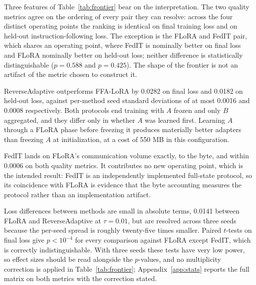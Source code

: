 Three features of Table~\ref{tab:frontier} bear on the interpretation. The two quality metrics agree on the ordering of every pair they can resolve: across the four distinct operating points the ranking is identical on final training loss and on held-out instruction-following loss. The exception is the FLoRA and FedIT pair, which shares an operating point, where FedIT is nominally better on final loss and FLoRA nominally better on held-out loss; neither difference is statistically distinguishable ($p{=}0.588$ and $p{=}0.425$). The shape of the frontier is not an artifact of the metric chosen to construct it.

ReverseAdaptive outperforms FFA-LoRA by 0.0282 on final loss and 0.0182 on held-out loss, against per-method seed standard deviations of at most 0.0016 and 0.0008 respectively. Both protocols end training with $A$ frozen and only $B$ aggregated, and they differ only in whether $A$ was learned first. Learning $A$ through a FLoRA phase before freezing it produces materially better adapters than freezing $A$ at initialization, at a cost of 550 MB in this configuration.

FedIT lands on FLoRA's communication volume exactly, to the byte, and within 0.0006 on both quality metrics. It contributes no new operating point, which is the intended result: FedIT is an independently implemented full-state protocol, so its coincidence with FLoRA is evidence that the byte accounting measures the protocol rather than an implementation artifact.

Loss differences between methods are small in absolute terms, 0.0141 between FLoRA and ReverseAdaptive at $\tau{=}0.01$, but are resolved across three seeds because the per-seed spread is roughly twenty-five times smaller. Paired $t$-tests on final loss give $p < 10^{-4}$ for every comparison against FLoRA except FedIT, which is correctly indistinguishable. With three seeds these tests have very low power, so effect sizes should be read alongside the $p$-values, and no multiplicity correction is applied in Table~\ref{tab:frontier}; Appendix~\ref{app:stats} reports the full matrix on both metrics with the correction stated.

